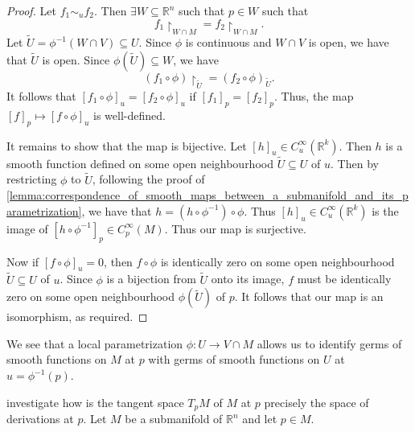 \documentclass[notoc,notitlepage]{tufte-book}
\begin{document}
\begin{proof}
  Let $f_1 \sim_u f_2$. Then $\exists W \subseteq \mathbb{R}^n$ such that $p \in
  W$ such that
  \begin{equation*}
    f_1 \restriction_{W \cap M} = f_2 \restriction_{W \cap M}.
  \end{equation*}
  Let $\tilde{U} = \phi^{-1}(W \cap V) \subseteq U$. Since $\phi$ is continuous
  and $W \cap V$ is open, we have that $\tilde{U}$ is open. Since
  $\phi(\tilde{U}) \subseteq W$, we have
  \begin{equation*}
    (f_1 \circ \phi) \restriction_{\tilde{U}} = (f_2 \circ \phi)_{\tilde{U}}.
  \end{equation*}
  It follows that $[ f_1 \circ \phi ]_u = [ f_2 \circ \phi ]_u$ if $[ f_1 ]_p =
  [ f_2 ]_p$. Thus, the map $[f]_p \mapsto [f \circ \phi]_u$ is well-defined.

  It remains to show that the map is bijective. Let $[h]_u \in
  C_u^\infty(\mathbb{R}^k)$. Then $h$ is a smooth function defined on some open
  neighbourhood $\tilde{U} \subseteq U$ of $u$. Then by restricting $\phi$ to
  $\tilde{U}$, following the proof of
  \cref{lemma:correspondence_of_smooth_maps_between_a_submanifold_and_its_parametrization},
  we have that $h = (h \circ \phi^{-1}) \circ \phi$. Thus $[h]_u \in
  C_u^\infty(\mathbb{R}^k)$ is the image of $[ h \circ \phi^{-1} ]_p \in
  C_p^\infty(M)$. Thus our map is surjective.

  Now if $[ f \circ \phi ]_u = 0$, then $f \circ \phi$ is identically zero on
  some open neighbourhood $\tilde{U} \subseteq U$ of $u$. Since $\phi$ is a
  bijection from $\tilde{U}$ onto its image, $f$ must be identically zero on
  some open neighbourhood $\phi(\tilde{U})$ of $p$. It follows that our map is
  an isomorphism, as required.
\end{proof}

\begin{note}
  We see that a local parametrization $\phi : U \to V \cap M$ allows us to
  identify germs of smooth functions on $M$ at $p$ with germs of smooth
  functions on $U$ at $u = \phi^{-1}(p)$.
\end{note}

 investigate how is the tangent space $T_p M$ of $M$ at
$p$ precisely the space of derivations at $p$. Let $M$ be a submanifold of
$\mathbb{R}^n$ and let $p \in M$.
\end{document}
